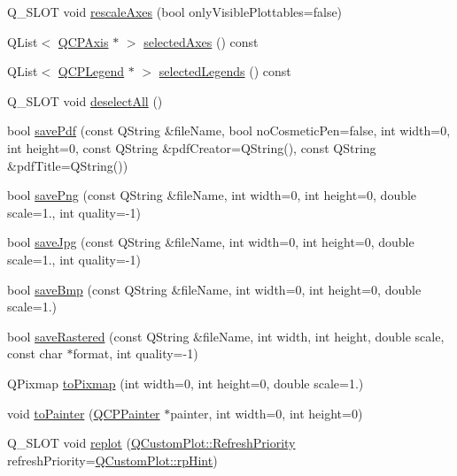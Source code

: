 \begin{DoxyCompactItemize}
\item 
Q\+\_\+\+S\+L\+O\+T void \hyperlink{class_q_custom_plot_ad86528f2cee6c7e446dea4a6e8839935}{rescale\+Axes} (bool only\+Visible\+Plottables=false)
\item 
Q\+List$<$ \hyperlink{class_q_c_p_axis}{Q\+C\+P\+Axis} $\ast$ $>$ \hyperlink{class_q_custom_plot_aa6baf867e8beb96ed5bd471f83ece903}{selected\+Axes} () const 
\item 
Q\+List$<$ \hyperlink{class_q_c_p_legend}{Q\+C\+P\+Legend} $\ast$ $>$ \hyperlink{class_q_custom_plot_a1ea6297300c3e2770e65f95836411755}{selected\+Legends} () const 
\item 
Q\+\_\+\+S\+L\+O\+T void \hyperlink{class_q_custom_plot_a9d4808ab925b003054085246c92a257c}{deselect\+All} ()
\item 
bool \hyperlink{class_q_custom_plot_a632da44c6d94ea8b271eb483b08b5114}{save\+Pdf} (const Q\+String \&file\+Name, bool no\+Cosmetic\+Pen=false, int width=0, int height=0, const Q\+String \&pdf\+Creator=Q\+String(), const Q\+String \&pdf\+Title=Q\+String())
\item 
bool \hyperlink{class_q_custom_plot_a7636261aff1f6d25c9da749ece3fc8b8}{save\+Png} (const Q\+String \&file\+Name, int width=0, int height=0, double scale=1., int quality=-\/1)
\item 
bool \hyperlink{class_q_custom_plot_a490c722092d1771e8ce4a7a73dfd84ab}{save\+Jpg} (const Q\+String \&file\+Name, int width=0, int height=0, double scale=1., int quality=-\/1)
\item 
bool \hyperlink{class_q_custom_plot_a6629d9e8e6da4bf18055ee0257fdce9a}{save\+Bmp} (const Q\+String \&file\+Name, int width=0, int height=0, double scale=1.)
\item 
bool \hyperlink{class_q_custom_plot_ab528b84cf92baabe29b1d0ef2f77c93e}{save\+Rastered} (const Q\+String \&file\+Name, int width, int height, double scale, const char $\ast$format, int quality=-\/1)
\item 
Q\+Pixmap \hyperlink{class_q_custom_plot_aabb974d71ce96c137dc04eb6eab844fe}{to\+Pixmap} (int width=0, int height=0, double scale=1.)
\item 
void \hyperlink{class_q_custom_plot_a1be68d5c0f1e086d6374d1340a193fb9}{to\+Painter} (\hyperlink{class_q_c_p_painter}{Q\+C\+P\+Painter} $\ast$painter, int width=0, int height=0)
\item 
Q\+\_\+\+S\+L\+O\+T void \hyperlink{class_q_custom_plot_a606fd384b2a637ce2c24899bcbde77d6}{replot} (\hyperlink{class_q_custom_plot_a45d61392d13042e712a956d27762aa39}{Q\+Custom\+Plot\+::\+Refresh\+Priority} refresh\+Priority=\hyperlink{class_q_custom_plot_a45d61392d13042e712a956d27762aa39adfa1f2387617168d9299f4c8ad15b332}{Q\+Custom\+Plot\+::rp\+Hint})
\end{DoxyCompactItemize}
